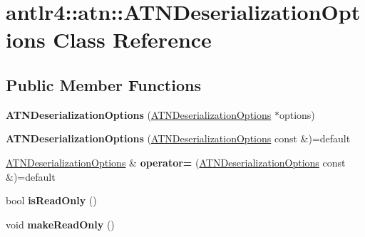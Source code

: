 \hypertarget{classantlr4_1_1atn_1_1ATNDeserializationOptions}{}\section{antlr4\+:\+:atn\+:\+:A\+T\+N\+Deserialization\+Options Class Reference}
\label{classantlr4_1_1atn_1_1ATNDeserializationOptions}
\subsection*{Public Member Functions}
\begin{DoxyCompactItemize}
\item 
\mbox{\label{classantlr4_1_1atn_1_1ATNDeserializationOptions_a6de965a7e58ea8c013a6f34e7d566252}} 
{\bfseries A\+T\+N\+Deserialization\+Options} (\hyperlink{classantlr4_1_1atn_1_1ATNDeserializationOptions}{A\+T\+N\+Deserialization\+Options} $\ast$options)
\item 
\mbox{\label{classantlr4_1_1atn_1_1ATNDeserializationOptions_ad0afe636bf23a3c7c8e4bd8db78c0a93}} 
{\bfseries A\+T\+N\+Deserialization\+Options} (\hyperlink{classantlr4_1_1atn_1_1ATNDeserializationOptions}{A\+T\+N\+Deserialization\+Options} const \&)=default
\item 
\mbox{\label{classantlr4_1_1atn_1_1ATNDeserializationOptions_a28535f48c323880c4ad9f3b4edc0ecce}} 
\hyperlink{classantlr4_1_1atn_1_1ATNDeserializationOptions}{A\+T\+N\+Deserialization\+Options} \& {\bfseries operator=} (\hyperlink{classantlr4_1_1atn_1_1ATNDeserializationOptions}{A\+T\+N\+Deserialization\+Options} const \&)=default
\item 
\mbox{\label{classantlr4_1_1atn_1_1ATNDeserializationOptions_a43b2b980a1926142a0b40405b8356f1a}} 
bool {\bfseries is\+Read\+Only} ()
\item 
\mbox{\label{classantlr4_1_1atn_1_1ATNDeserializationOptions_af5dd63a76ab916c4f0328c7e9cca9094}} 
void {\bfseries make\+Read\+Only} ()
\item 

\end{DoxyCompactItemize}
